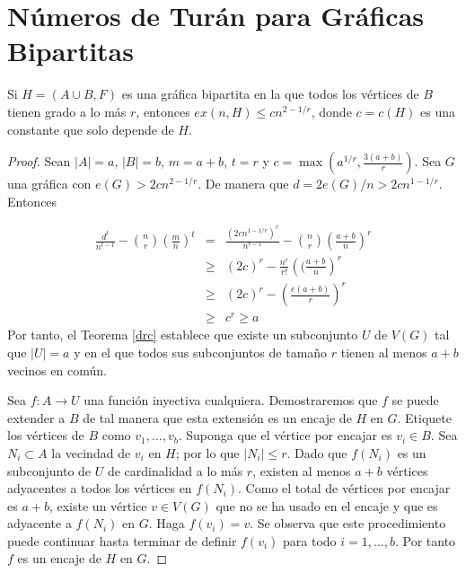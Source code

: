 \section{Números de Turán para Gráficas Bipartitas}

\begin{theorem}\label{turan-drc}
  Si $H = (A \cup B, F)$ es una gráfica bipartita en la que todos los
  vértices de $B$ tienen grado
  a lo más $r$, entonces $ex(n, H) \leq c n^{2 - 1 / r}$, donde $c =
  c(H)$ es una constante que solo depende de $H$.
\end{theorem}
\begin{proof}
  Sean $\vert A \vert = a$, $\vert B
  \vert = b$, $m = a + b$, $t = r$
  y $c = \max(a^{1/r}, \frac{3(a + b)}{r})$. Sea $G$ una gráfica con
  $e(G) > 2 c n^{2 -1 /
  r}$. De manera que $d = 2e(G) / n > 2 c n^{1 - 1/r}$. Entonces

  \begin{eqnarray*}
    \frac{d^{t}}{n^{t-1}} - \binom{n}{r} \left(\frac{m}{n}\right)^t
    &=& \frac{(2c
    n^{1-1/r})^r}{n^{r-1}}  - \binom{n}{r} \left(\frac{a + b}{n}\right)^r\\
    &\geq& (2c)^r - \frac{n^r}{r!} \left((\frac{a + b}{n}\right)^r \\
      &\geq& (2c)^r - \left(\frac{e (a + b)}{r}\right)^r\\
      &\geq& c^r \geq a
    \end{eqnarray*}
    Por tanto, el Teorema \ref{drc} establece que existe un subconjunto
    $U$ de $V(G)$ tal que $\vert U \vert = a$ y en el que todos sus
    subconjuntos de tamaño
    $r$ tienen al menos $a + b$ vecinos en común.

    Sea $f: A \rightarrow U$ una función inyectiva cualquiera.
    Demostraremos que $f$ se puede extender a $B$ de tal manera que
    esta extensión es un encaje de $H$ en $G$. Etiquete los vértices de $B$ como
    $v_1, \ldots, v_b$. Suponga que el vértice por encajar es $v_i \in
    B$. Sea $N_i \subset A$ la vecindad de $v_i$ en $H$; por lo que
    $\vert N_i \vert \leq r$. Dado que $f(N_i)$ es un subconjunto de
    $U$ de cardinalidad a lo más $r$, existen al menos $a + b$ vértices
    adyacentes a todos los vértices en $f(N_i)$. Como el total de
    vértices por encajar es $a + b$, existe un vértice $v \in V(G)$ que
    no se ha usado en el encaje y que es adyacente a $f(N_i)$ en $G$.
    Haga $f(v_i)  = v$. Se observa que este procedimiento puede
    continuar hasta terminar de definir $f(v_i)$ para todo $i = 1,
    \ldots, b$. Por tanto $f$ es un encaje de  $H$ en $G$.
  \end{proof}

